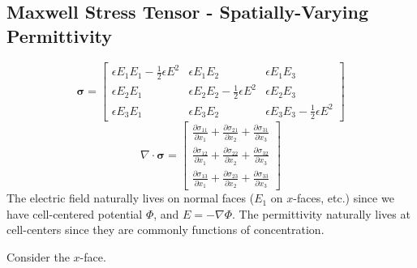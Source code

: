 \documentclass[final]{siamltex}
\def\sigmab {\boldsymbol{\sigma}}
\def\half   {\frac{1}{2}}
\begin{document}
\subsection{Maxwell Stress Tensor - Spatially-Varying Permittivity}
\begin{equation}
\sigmab =
\left[\begin{array}{ccc}
\epsilon E_1 E_1 - \half\epsilon E^2 & \epsilon E_1 E_2 & \epsilon E_1 E_3 \\
\epsilon E_2 E_1 & \epsilon E_2 E_2 - \half\epsilon E^2 & \epsilon E_2 E_3 \\
\epsilon E_3 E_1 & \epsilon E_3 E_2 & \epsilon E_3 E_3- \half\epsilon E^2 
\end{array}\right]
\end{equation}
\begin{equation}
\nabla\cdot\sigmab =
\left[\begin{array}{c}
\frac{\partial\sigma_{11}}{\partial x_1} + \frac{\partial\sigma_{21}}{\partial x_2} + \frac{\partial\sigma_{31}}{\partial x_3} \\
\frac{\partial\sigma_{12}}{\partial x_1} + \frac{\partial\sigma_{22}}{\partial x_2} + \frac{\partial\sigma_{32}}{\partial x_3} \\
\frac{\partial\sigma_{13}}{\partial x_1} + \frac{\partial\sigma_{23}}{\partial x_2} + \frac{\partial\sigma_{33}}{\partial x_3}
\end{array}\right]
\end{equation}
The electric field naturally lives on normal faces ($E_1$ on $x$-faces, etc.) since we have cell-centered potential $\Phi$, and $E=-\nabla\Phi$.
The permittivity naturally lives at cell-centers since they are commonly functions of concentration.

Consider the $x$-face.




\end{document}
